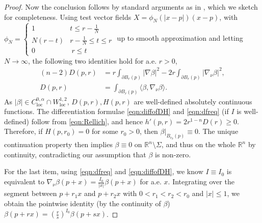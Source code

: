 \documentclass[11pt,a4paper]{article}
\numberwithin{equation}{section}%
\theoremstyle{definition}
\newcommand{\R}{\mathbb{R}}
\begin{document}
\begin{proof}
Now the conclusion follows by standard arguments as in \cite[Chapter 3]{DeLellis-Spadaro}, which we sketch for completeness. Using test vector fields $X=\phi_N(|x-p|)(x-p)$, with $\phi_N=\left\{ \begin{array}{lc}
        1 &  t\leqslant r-\frac{1}{N}\\ 
        N(r-t) & r-\frac{1}{N}\leqslant t\leqslant r
        \\ 0&~r\leqslant t
    \end{array} \right.$ up to smooth approximation and letting $N\to \infty$, the following two identities hold for a.e. $r>0$, 
    \begin{equation}
    \label{eqn:Rellich}
        \begin{aligned}
            (n-2)D(p,r)&=r\int_{\partial B_r(p)}|\nabla \beta|^2-2r\int_{\partial B_r(p)} |\nabla_\nu\beta|^2,
            \\D(p,r)&=\int_{\partial B_r(p)}\langle \beta,\nabla_\nu \beta\rangle. 
        \end{aligned}
    \end{equation}
    As $|\beta| \in C^{0,\alpha}_{\operatorname{loc}}\cap W^{1,2}_{\operatorname{loc}}$, $D(p,r),H(p,r)$ are well-defined absolutely continuous functions. The differentiation formulae \eqref{eqn:diffofDH} and \eqref{eqn:dfreq} (if $I$ is well-defined) follow from \eqref{eqn:Rellich}, and hence $h'(p,r)=2r^{1-n}D(r)\geqslant 0$. Therefore, if $H(p,r_0)=0$ for some $r_0>0$, then $\beta |_{B_{r_0}(p)}\equiv 0$. The unique continuation property then implies $\beta \equiv 0$ on $\R^n\setminus\Sigma$, and thus on the whole $\R^n$ by continuity, contradicting our assumption that $\beta$ is non-zero.  

    For the last item, using \eqref{eqn:dfreq} and \eqref{eqn:diffofDH}, we know $I\equiv I_0$ is equivalent to $\nabla_\nu \beta(p+x)=\frac{I_0}{|x|}\beta(p+x)$ for a.e. $x$. Integrating over the segment between $p+r_1x$ and $p+r_2x$ with $0<r_1<r_2<r_0$ and $|x|\leqslant 1$, we obtain the pointwise identity (by the continuity of $\beta$) $\beta(p+rx)=(\frac{r}{s})^{I_0}\beta (p+sx)$.  
\end{proof}
\end{document}

